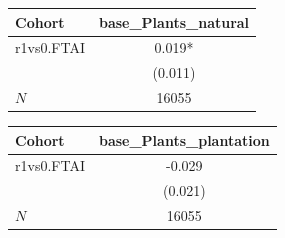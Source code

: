 {
\def\sym#1{\ifmmode^{#1}\else\(^{#1}\)\fi}
\begin{tabular}{l*{1}{c}}
\toprule
Cohort    &base\_Plants\_natural   \\
\midrule
r1vs0.FTAI&    0.019*  \\
          &  (0.011)   \\
\midrule
\(N\)     &    16055   \\
\bottomrule
\end{tabular}
}
{
\def\sym#1{\ifmmode^{#1}\else\(^{#1}\)\fi}
\begin{tabular}{l*{1}{c}}
\toprule
Cohort    &base\_Plants\_plantation   \\
\midrule
r1vs0.FTAI&   -0.029   \\
          &  (0.021)   \\
\midrule
\(N\)     &    16055   \\
\bottomrule
\end{tabular}
}

